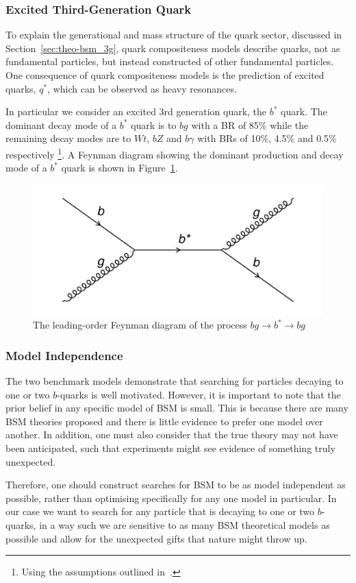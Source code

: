 \subsubsection{Excited Third-Generation Quark}

To explain the generational and mass structure of the quark sector, discussed in Section~\ref{sec:theo-bsm_3g},
quark compositeness models describe quarks, not as fundamental particles, but instead constructed of other fundamental particles.
One consequence of quark compositeness models is the prediction of excited quarks, $q^{*}$, which can be observed as heavy resonances.

In particular we consider an excited 3rd generation quark, the $b^{*}$ quark.
The dominant decay mode of a $b^{*}$ quark is to $bg$ with a BR of 85\%
while the remaining decay modes are to $Wt$, $bZ$ and $b\gamma$ with BRs of 10\%, 4.5\% and 0.5\% respectively
\footnote{Using the assumptions outlined in~\cite{theo-bsm_bstar}.}.
A Feynman diagram showing the  dominant production and decay mode of a $b^*$ quark is shown in Figure~\ref{fig:theo-bsm_bstar}.

\begin{figure}[!hbt]
  \begin{center}
    \includegraphics[width=0.7\linewidth, angle=0]{figs/Theory/bsm_bstar.png}
  \end{center}
  \caption{The leading-order Feynman diagram of the process $bg \to b^* \to bg$}
  \label{fig:theo-bsm_bstar}
\end{figure}


\subsubsection{Model Independence}

The two benchmark models demonstrate that searching for particles decaying to one or two $b$-quarks
is well motivated.
However, it is important to note that the prior belief in any specific model of BSM is small.
This is because there are many BSM theories proposed
and there is little evidence to prefer one model over another.
In addition, one must also consider that the true theory may not have been anticipated,
such that experiments might see evidence of something truly unexpected.

Therefore, one should construct searches for BSM to be as model independent as possible,
rather than optimising specifically for any one model in particular.
In our case we want to search for any particle that is decaying to one or two
$b$-quarks, in a way such we are sensitive to as many BSM theoretical models as possible
and allow for the unexpected gifts that nature might throw up.
